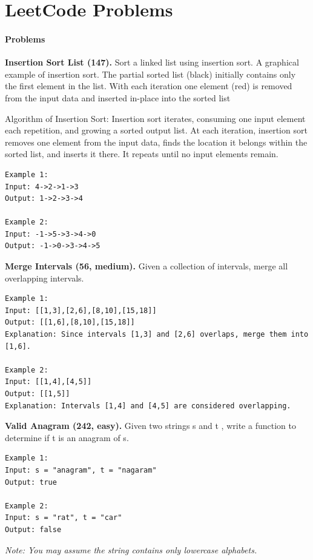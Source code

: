\documentclass[../main.tex]{subfiles}
\begin{document}
\section{LeetCode Problems}

\paragraph{Problems}

\begin{examples}
    \item \textbf{Insertion Sort List (147).} Sort a linked list using insertion sort. A graphical example of insertion sort. The partial sorted list (black) initially contains only the first element in the list. With each iteration one element (red) is removed from the input data and inserted in-place into the sorted list
    
    Algorithm of Insertion Sort: Insertion sort iterates, consuming one input element each repetition, and growing a sorted output list.
    At each iteration, insertion sort removes one element from the input data, finds the location it belongs within the sorted list, and inserts it there. It repeats until no input elements remain. 
    \begin{lstlisting}[numbers=none]
Example 1:
Input: 4->2->1->3
Output: 1->2->3->4

Example 2:
Input: -1->5->3->4->0
Output: -1->0->3->4->5
    \end{lstlisting}
    
    \item \textbf{Merge Intervals (56, medium).} Given a collection of intervals, merge all overlapping intervals.
\begin{lstlisting}[numbers=none]
Example 1:
Input: [[1,3],[2,6],[8,10],[15,18]]
Output: [[1,6],[8,10],[15,18]]
Explanation: Since intervals [1,3] and [2,6] overlaps, merge them into [1,6].

Example 2:
Input: [[1,4],[4,5]]
Output: [[1,5]]
Explanation: Intervals [1,4] and [4,5] are considered overlapping.
\end{lstlisting}

\item \textbf{Valid Anagram (242, easy).} Given two strings s and t , write a function to determine if t is an anagram of s.
\begin{lstlisting}[numbers=none]
Example 1:
Input: s = "anagram", t = "nagaram"
Output: true

Example 2:
Input: s = "rat", t = "car"
Output: false
\end{lstlisting}
\textit{Note: You may assume the string contains only lowercase alphabets.}


\end{examples}
\end{document}
